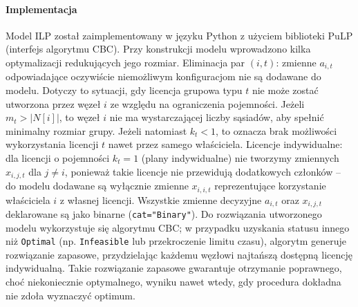 \paragraph{Implementacja}
Model ILP został zaimplementowany w języku Python z użyciem biblioteki PuLP (interfejs algorytmu CBC). Przy konstrukcji modelu wprowadzono kilka optymalizacji redukujących jego rozmiar. Eliminacja par $(i,t)$: zmienne $a_{i,t}$ odpowiadające oczywiście niemożliwym konfiguracjom nie są dodawane do modelu. Dotyczy to sytuacji, gdy licencja grupowa typu $t$ nie może zostać utworzona przez węzeł $i$ ze względu na ograniczenia pojemności. Jeżeli $m_t > |N[i]|$, to węzeł $i$ nie ma wystarczającej liczby sąsiadów, aby spełnić minimalny rozmiar grupy. Jeżeli natomiast $k_t < 1$, to oznacza brak możliwości wykorzystania licencji $t$ nawet przez samego właściciela. Licencje indywidualne: dla licencji o pojemności $k_t = 1$ (plany indywidualne) nie tworzymy zmiennych $x_{i,j,t}$ dla $j \neq i$, ponieważ takie licencje nie przewidują dodatkowych członków -- do modelu dodawane są wyłącznie zmienne $x_{i,i,t}$ reprezentujące korzystanie właściciela $i$ z własnej licencji. Wszystkie zmienne decyzyjne $a_{i,t}$ oraz $x_{i,j,t}$ deklarowane są jako binarne (\verb|cat="Binary"|). Do rozwiązania utworzonego modelu wykorzystuje się algorytmu CBC; w przypadku uzyskania statusu innego niż \texttt{Optimal} (np. \texttt{Infeasible} lub przekroczenie limitu czasu), algorytm generuje rozwiązanie zapasowe, przydzielając każdemu węzłowi najtańszą dostępną licencję indywidualną. Takie rozwiązanie zapasowe gwarantuje otrzymanie poprawnego, choć niekoniecznie optymalnego, wyniku nawet wtedy, gdy procedura dokładna nie zdoła wyznaczyć optimum.

